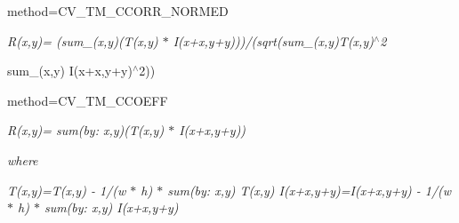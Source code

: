 {\itshape }

{\itshape 
\begin{DoxyItemize}
\item method=C\+V\+\_\+\+T\+M\+\_\+\+C\+C\+O\+R\+R\+\_\+\+N\+O\+R\+M\+ED 
\end{DoxyItemize}}

{\itshape }

{\itshape {\itshape R(x,y)= (sum\+\_\+(x\textquotesingle{},y\textquotesingle{})(T(x\textquotesingle{},y\textquotesingle{}) $\ast$ I(x+x\textquotesingle{},y+y\textquotesingle{})))/(sqrt(sum\+\_\+(x\textquotesingle{},y\textquotesingle{})T(x\textquotesingle{},y\textquotesingle{})$^\wedge$2
\begin{DoxyItemize}
\item sum\+\_\+(x\textquotesingle{},y\textquotesingle{}) I(x+x\textquotesingle{},y+y\textquotesingle{})$^\wedge$2))
\end{DoxyItemize}}}

{\itshape {\itshape }}

{\itshape {\itshape 
\begin{DoxyItemize}
\item method=C\+V\+\_\+\+T\+M\+\_\+\+C\+C\+O\+E\+FF 
\end{DoxyItemize}}}

{\itshape {\itshape }}

{\itshape {\itshape {\itshape R(x,y)= sum(by\+: x\textquotesingle{},y\textquotesingle{})(T\textquotesingle{}(x\textquotesingle{},y\textquotesingle{}) $\ast$ I\textquotesingle{}(x+x\textquotesingle{},y+y\textquotesingle{}))}}}

{\itshape {\itshape }}

{\itshape {\itshape }}

{\itshape {\itshape where}}

{\itshape {\itshape }}

{\itshape {\itshape }}

{\itshape {\itshape {\itshape T\textquotesingle{}(x\textquotesingle{},y\textquotesingle{})=T(x\textquotesingle{},y\textquotesingle{}) -\/ 1/(w $\ast$ h) $\ast$ sum(by\+: x\textquotesingle{}\textquotesingle{},y\textquotesingle{}\textquotesingle{}) T(x\textquotesingle{}\textquotesingle{},y\textquotesingle{}\textquotesingle{}) I\textquotesingle{}(x+x\textquotesingle{},y+y\textquotesingle{})=I(x+x\textquotesingle{},y+y\textquotesingle{}) -\/ 1/(w $\ast$ h) $\ast$ sum(by\+: x\textquotesingle{}\textquotesingle{},y\textquotesingle{}\textquotesingle{}) I(x+x\textquotesingle{}\textquotesingle{},y+y\textquotesingle{}\textquotesingle{}) }}}

